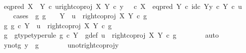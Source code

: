 \begin{isabellebody}
\isanewline
\ \ \isamarkupfalse%
\ {\isachardoublequoteopen}eq{\isacharunderscore}{\kern0pt}pred\ {\isacharparenleft}{\kern0pt}X\ {\isasymCoprod}\ Y{\isacharparenright}{\kern0pt}\ {\isasymcirc}\isactrlsub c\ {\isasymlangle}u{\isacharcomma}{\kern0pt}right{\isacharunderscore}{\kern0pt}coproj\ X\ Y\ {\isasymcirc}\isactrlsub c\ y{\isasymrangle}\ {\isacharequal}{\kern0pt}\ {\isacharparenleft}{\kern0pt}{\isasymf}\ {\isasymcirc}\isactrlsub c\ {\isasymbeta}\isactrlbsub X\isactrlesub {\isacharparenright}{\kern0pt}\ {\isasymamalg}\ {\isacharparenleft}{\kern0pt}eq{\isacharunderscore}{\kern0pt}pred\ Y\ {\isasymcirc}\isactrlsub c\ {\isasymlangle}id\isactrlsub c\ Y{\isacharcomma}{\kern0pt}y\ {\isasymcirc}\isactrlsub c\ {\isasymbeta}\isactrlbsub Y\isactrlesub {\isasymrangle}{\isacharparenright}{\kern0pt}\ {\isasymcirc}\isactrlsub c\ u{\isachardoublequoteclose}\isanewline
\ \ \isamarkupfalse%
\ {\isacharparenleft}{\kern0pt}cases\ {\isachardoublequoteopen}{\isasymexists}\ g{\isachardot}{\kern0pt}\ g\ {\isacharcolon}{\kern0pt}\ {\isasymone}\ {\isasymrightarrow}\ Y\ {\isasymand}\ u\ {\isacharequal}{\kern0pt}\ right{\isacharunderscore}{\kern0pt}coproj\ X\ Y\ {\isasymcirc}\isactrlsub c\ g{\isachardoublequoteclose}{\isacharparenright}{\kern0pt}\isanewline
\ \ \ \ \isamarkupfalse%
\ {\isachardoublequoteopen}{\isasymexists}g{\isachardot}{\kern0pt}\ g\ {\isasymin}\isactrlsub c\ Y\ {\isasymand}\ u\ {\isacharequal}{\kern0pt}\ right{\isacharunderscore}{\kern0pt}coproj\ X\ Y\ {\isasymcirc}\isactrlsub c\ g{\isachardoublequoteclose}\isanewline
\ \ \ \ \isamarkupfalse%
\ \isamarkupfalse%
\ g\ \ g{\isacharunderscore}{\kern0pt}type{\isacharbrackleft}{\kern0pt}type{\isacharunderscore}{\kern0pt}rule{\isacharbrackright}{\kern0pt}{\isacharcolon}{\kern0pt}\ {\isachardoublequoteopen}g\ {\isasymin}\isactrlsub c\ Y{\isachardoublequoteclose}\ \ g{\isacharunderscore}{\kern0pt}def{\isacharcolon}{\kern0pt}\ {\isachardoublequoteopen}u\ {\isacharequal}{\kern0pt}\ right{\isacharunderscore}{\kern0pt}coproj\ X\ Y\ {\isasymcirc}\isactrlsub c\ g{\isachardoublequoteclose}\isanewline
\ \ \ \ \ \ \isamarkupfalse%
\ auto\isanewline
\ \ \ \ \isamarkupfalse%
\ \isamarkupfalse%
\ y{\isacharunderscore}{\kern0pt}not{\isacharunderscore}{\kern0pt}g{\isacharcolon}{\kern0pt}\ {\isachardoublequoteopen}y\ {\isasymnoteq}\ g{\isachardoublequoteclose}\isanewline
\ \ \ \ \ \ \isamarkupfalse%
\ u{\isacharunderscore}{\kern0pt}not{\isacharunderscore}{\kern0pt}right{\isacharunderscore}{\kern0pt}coproj{\isacharunderscore}{\kern0pt}y\ \isamarkupfalse%

\end{isabellebody}
